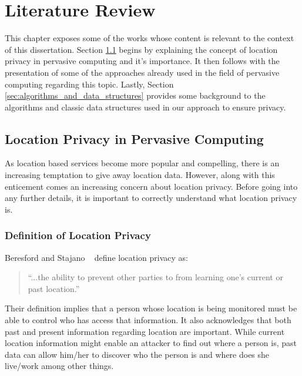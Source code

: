 \chapter{Literature Review}
\label{chap:literature_review}

This chapter exposes some of the works whose content is relevant to
the context of this dissertation. Section
\ref{sec:privacy_pervasive_computing} begins by explaining the concept
of location privacy in pervasive computing and it's importance. It then follows
with the presentation of some of the approaches already used in the
field of pervasive computing regarding this topic. Lastly, Section
\ref{sec:algorithms_and_data_structures} provides some background to
the algorithms and classic data structures used in our approach to ensure
privacy.

\section{Location Privacy in Pervasive Computing}
\label{sec:privacy_pervasive_computing}

As location based services become more popular and compelling, there
is an increasing temptation to give away location data. However, along
with this enticement comes an increasing concern about location
privacy. Before going into any further details, it is important to
correctly understand what location privacy is.

\subsection{Definition of Location Privacy}
\label{sec:definition_privacy}

Beresford and Stajano ~\cite{1186725} define location privacy as:
\begin{quotation}
  ``...the ability to prevent other parties to from learning one's
  current or past location.''
\end{quotation}
Their definition implies that a person whose location is being
monitored must be able to control who has access that information.
It also acknowledges that both past and present information regarding location
are important. While current location information might enable an
attacker to find out where a person is, past data can allow him/her to
discover who the person is and where does she live/work among other
things.


